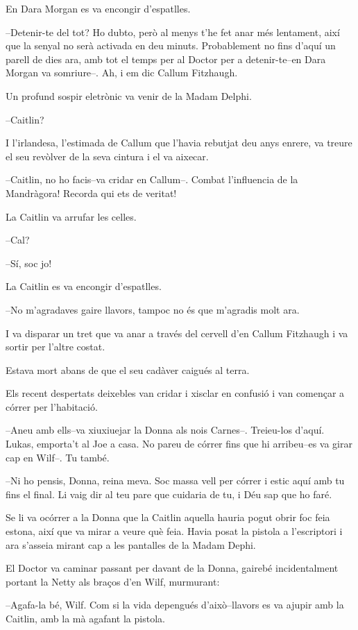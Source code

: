 En Dara Morgan es va encongir d'espatlles.

--Detenir-te del tot? Ho dubto, però al menys t'he fet anar més
lentament, així que la senyal no serà activada en deu minuts.
Probablement no fins d'aquí un parell de dies ara, amb tot el temps per
al Doctor per a detenir-te--en Dara Morgan va somriure--. Ah, i em dic
Callum Fitzhaugh.

Un profund sospir eletrònic va venir de la Madam Delphi.

--Caitlin?

I l'irlandesa, l'estimada de Callum que l'havia rebutjat deu anys
enrere, va treure el seu revòlver de la seva cintura i el va aixecar.

--Caitlin, no ho facis--va cridar en Callum--. Combat l'influencia de la
Mandràgora! Recorda qui ets de veritat!

La Caitlin va arrufar les celles.

--Cal?

--Sí, soc jo!

La Caitlin es va encongir d'espatlles.

--No m'agradaves gaire llavors, tampoc no és que m'agradis molt ara.

I va disparar un tret que va anar a través del cervell d'en Callum
Fitzhaugh i va sortir per l'altre costat.

Estava mort abans de que el seu cadàver caigués al terra.

Els recent despertats deixebles van cridar i xisclar en confusió i van
començar a córrer per l'habitació.

--Aneu amb ells--va xiuxiuejar la Donna als nois Carnes--. Treieu-los
d'aquí. Lukas, emporta't al Joe a casa. No pareu de córrer fins que hi
arribeu--es va girar cap en Wilf--. Tu també.

--Ni ho pensis, Donna, reina meva. Soc massa vell per córrer i estic
aquí amb tu fins el final. Li vaig dir al teu pare que cuidaria de tu, i
Déu sap que ho faré.

Se li va ocórrer a la Donna que la Caitlin aquella hauria pogut obrir
foc feia estona, així que va mirar a veure què feia. Havia posat la
pistola a l'escriptori i ara s'asseia mirant cap a les pantalles de la
Madam Dephi.

El Doctor va caminar passant per davant de la Donna, gairebé
incidentalment portant la Netty als braços d'en Wilf, murmurant:

--Agafa-la bé, Wilf. Com si la vida depengués d'això--llavors es va
ajupir amb la Caitlin, amb la mà agafant la pistola.

